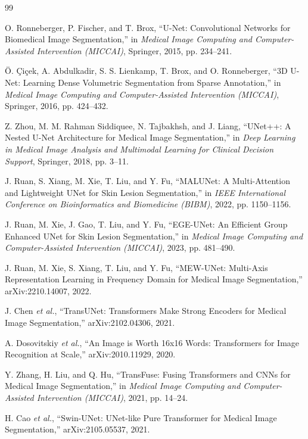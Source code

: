 \documentclass[conference]{IEEEtran}
\begin{document}
\begin{thebibliography}{99}

O. Ronneberger, P. Fischer, and T. Brox, ``U-Net: Convolutional Networks for Biomedical Image Segmentation,'' in \emph{Medical Image Computing and Computer-Assisted Intervention (MICCAI)}, Springer, 2015, pp. 234–241.

Ö. Çiçek, A. Abdulkadir, S. S. Lienkamp, T. Brox, and O. Ronneberger, ``3D U-Net: Learning Dense Volumetric Segmentation from Sparse Annotation,'' in \emph{Medical Image Computing and Computer-Assisted Intervention (MICCAI)}, Springer, 2016, pp. 424–432.

Z. Zhou, M. M. Rahman Siddiquee, N. Tajbakhsh, and J. Liang, ``UNet++: A Nested U-Net Architecture for Medical Image Segmentation,'' in \emph{Deep Learning in Medical Image Analysis and Multimodal Learning for Clinical Decision Support}, Springer, 2018, pp. 3–11.

J. Ruan, S. Xiang, M. Xie, T. Liu, and Y. Fu, ``MALUNet: A Multi-Attention and Lightweight UNet for Skin Lesion Segmentation,'' in \emph{IEEE International Conference on Bioinformatics and Biomedicine (BIBM)}, 2022, pp. 1150–1156.

J. Ruan, M. Xie, J. Gao, T. Liu, and Y. Fu, ``EGE-UNet: An Efficient Group Enhanced UNet for Skin Lesion Segmentation,'' in \emph{Medical Image Computing and Computer-Assisted Intervention (MICCAI)}, 2023, pp. 481–490.

J. Ruan, M. Xie, S. Xiang, T. Liu, and Y. Fu, ``MEW-UNet: Multi-Axis Representation Learning in Frequency Domain for Medical Image Segmentation,'' arXiv:2210.14007, 2022.

J. Chen \emph{et al.}, ``TransUNet: Transformers Make Strong Encoders for Medical Image Segmentation,'' arXiv:2102.04306, 2021.

A. Dosovitskiy \emph{et al.}, ``An Image is Worth 16x16 Words: Transformers for Image Recognition at Scale,'' arXiv:2010.11929, 2020.

Y. Zhang, H. Liu, and Q. Hu, ``TransFuse: Fusing Transformers and CNNs for Medical Image Segmentation,'' in \emph{Medical Image Computing and Computer-Assisted Intervention (MICCAI)}, 2021, pp. 14–24.

H. Cao \emph{et al.}, ``Swin-UNet: UNet-like Pure Transformer for Medical Image Segmentation,'' arXiv:2105.05537, 2021.


\end{thebibliography}
\end{document}
